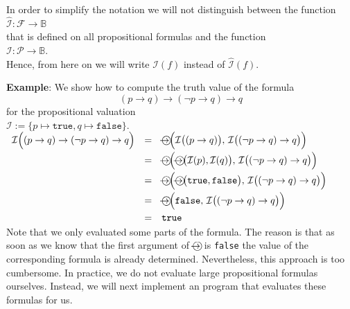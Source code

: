 In order to simplify the notation we will not distinguish between the function
\\[0.2cm]
\hspace*{1.3cm}
$\widehat{\mathcal{I}}: \mathcal{F} \rightarrow \mathbb{B}$
\\[0.2cm]
that is defined on all propositional formulas and the function
\\[0.2cm]
\hspace*{1.3cm}
$\mathcal{I}: \mathcal{P} \rightarrow \mathbb{B}$.
\\[0.2cm]
Hence, from here on we will write $\mathcal{I}(f)$ instead of $\widehat{\mathcal{I}}(f)$.

\noindent
\textbf{Example}: We show how to compute the truth value of the formula
$$  (p \rightarrow q) \rightarrow (\neg p \rightarrow q) \rightarrow q $$
for the propositional valuation
\\[0.2cm]
\hspace*{1.3cm}
$\mathcal{I} := \{ p \mapsto \mathtt{true}, q \mapsto \mathtt{false} \}$.
\\[0.2cm]
\hspace*{1.3cm}
$
  \begin{array}[b]{lcl}
   \mathcal{I}\Bigl( (p \rightarrow q) \rightarrow (\neg p \rightarrow q) \rightarrow q  \Bigr) 
   & = &  \circright\Bigl( \mathcal{I}\bigl( (p \rightarrow q) \bigr),\, \mathcal{I}\bigl((\neg p \rightarrow q) \rightarrow q\bigr) \Bigr) \\[0.2cm]
   & = & \circright\Bigl( \circright\bigl( \mathcal{I}(p), \mathcal{I}(q) \bigr),\, \mathcal{I}\bigl((\neg p \rightarrow q) \rightarrow q\bigr) \Bigr) \\[0.2cm]
   & = & \circright\Bigl( \circright\bigl( \texttt{true}, \texttt{false} \bigr),\, \mathcal{I}\bigl((\neg p \rightarrow q) \rightarrow q\bigr) \Bigr) \\[0.2cm]
   & = & \circright\Bigl( \texttt{false}, \, \mathcal{I}\bigl((\neg p \rightarrow q) \rightarrow q\bigr) \Bigr) \\[0.2cm]
   & = & \texttt{true} 
  \end{array}
$ \eox
\\[0.2cm]
Note that we only evaluated some parts of the formula.  The reason is that as soon as we know that the first
argument of $\circright$ is \texttt{false} the value of the corresponding formula is already determined.
Nevertheless, this approach is too cumbersome.  In practice, we do not evaluate large propositional formulas
ourselves.  Instead, we will next implement an \Fsharp{} program that evaluates these formulas for us.


